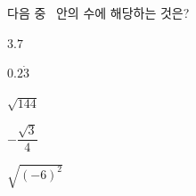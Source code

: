 다음 중 \blank\ 안의 수에 해당하는 것은?
\begin{choices32}{\rule[-3ex]{0pt}{8ex}$3.7$}{\rule[-3ex]{0pt}{8ex}$0.2\dot{3}$}{\rule[-3ex]{0pt}{8ex}$\sqrt{144}$}{\rule[-3ex]{0pt}{8ex}$-\dfrac{\sqrt{3}}{4}$}{\rule[-3ex]{0pt}{8ex}$\sqrt{(-6)^2}$}\end{choices32}
